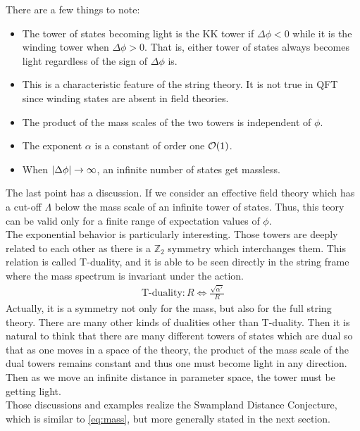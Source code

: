 There are a few things to note:
\begin{itemize}
    \item {The tower of states becoming light is the KK tower if $\Delta \phi <0$ while it is the winding tower when $\Delta \phi >0$. That is, either tower of states always becomes light regardless of the sign of $\Delta\phi$ is.}
    \item {This is a characteristic feature of the string theory. It is not true in QFT since winding states are absent in field theories.}
    \item {The product of the mass scales of the two towers is independent of $\phi$.}
    \item {The exponent $\alpha$ is a constant of order one $\order{1}$.}
    \item {When $\abs{\Delta \phi} \rightarrow  \infty$, an infinite number of states get massless.} 
\end{itemize}
The last point has a discussion. If we consider an effective field theory which has a cut-off $\Lambda$ below the mass scale of an infinite tower of states. Thus, this teory can be valid only for a finite range of expectation values of $\phi$. \\
\indent The exponential behavior is particularly interesting. Those towers are deeply related to each other as there is a $\mathbb{Z}_{2}$ symmetry which interchanges them. This relation is called T-duality, and it is able to be seen directly in the string frame where the mass spectrum is invariant under the action. 
\begin{align}
    \text{T-duality} : R \Leftrightarrow \frac{\sqrt{\alpha'}}{R}
\end{align}
Actually, it is a symmetry not only for the mass, but also for the full string theory. There are many other kinds of dualities other than T-duality. Then it is natural to think that there are many different towers of states which are dual so that as one moves in a space of the theory, the product of the mass scale of the dual towers remains constant and thus one must become light in any direction. Then as we move an infinite distance in parameter space, the tower must be getting light. \\
\indent Those discussions and examples realize the Swampland Distance Conjecture, which is similar to \ref{eq:mass}, but more generally stated in the next section.



